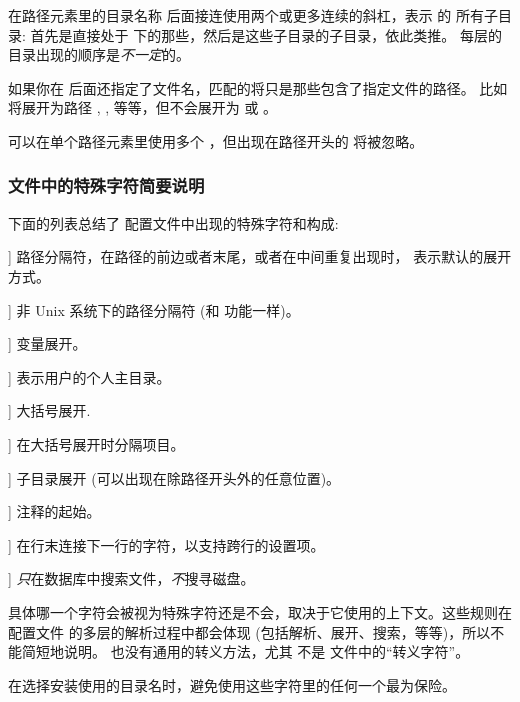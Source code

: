 \documentclass{article}
\begin{document}
在路径元素里的目录名称  后面接连使用两个或更多连续的斜杠，表示  的
所有子目录: 首先是直接处于  下的那些，然后是这些子目录的子目录，依此类推。
每层的目录出现的顺序是\emph{不一定}的。

如果你在 \samp{//} 后面还指定了文件名，匹配的将只是那些包含了指定文件的路径。
比如  将展开为路径 , ,
 等等，但不会展开为  或 。

可以在单个路径元素里使用多个 \samp{//}，但出现在路径开头的 \samp{//}
将被忽略。

\subsubsection{ 文件中的特殊字符简要说明}
\label{sec:cnf-special-chars}

下面的列表总结了 \KPS{} 配置文件中出现的特殊字符和构成: 

\newcommand{\CODE}[1]{\makebox[3em][l]{\code{#1}}}
\begin{ttdescription}
\item[\CODE{:}] 路径分隔符，在路径的前边或者末尾，或者在中间重复出现时，
表示默认的展开方式。\par
\item[\CODE{;}] 非 Unix 系统下的路径分隔符 (和 \code{:} 功能一样)。
\item[\CODE{\$}] 变量展开。
\item[\CODE{\string~}] 表示用户的个人主目录。
\item[\CODE{\char`\{...\char`\}}] 大括号展开.
\item[\CODE{,}] 在大括号展开时分隔项目。
\item[\CODE{//}] 子目录展开 (可以出现在除路径开头外的任意位置)。
\item[\CODE{\%{\rm\ and }\#}] 注释的起始。
\item[\CODE{\bs}] 在行末连接下一行的字符，以支持跨行的设置项。
\item[\CODE{!!}] \emph{只}在数据库中搜索文件，\emph{不}搜寻磁盘。
\end{ttdescription}

具体哪一个字符会被视为特殊字符还是不会，取决于它使用的上下文。这些规则在配置文件
的多层的解析过程中都会体现 (包括解析、展开、搜索，等等)，所以不能简短地说明。
也没有通用的转义方法，尤其 \samp{\bs} 不是  文件中的“转义字符”。

在选择安装使用的目录名时，避免使用这些字符里的任何一个最为保险。
\end{document}
